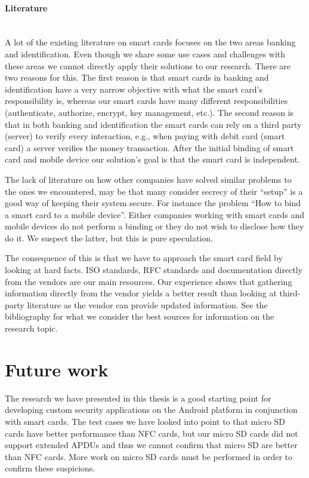 \paragraph{Literature}\mbox{}\\
A lot of the existing literature on smart cards focuses on the two areas banking and identification. Even though we share some use cases and challenges with these areas we cannot directly apply their solutions to our research. There are two reasons for this. The first reason is that smart cards in banking and identification have a very narrow objective with what the smart card's responsibility is, whereas our smart cards have many different responsibilities (authenticate, authorize, encrypt, key management, etc.). The second reason is that in both banking and identification the smart cards can rely on a third party (server) to verify every interaction, e.g., when paying with debit card (smart card) a server verifies the money transaction. After the initial binding of smart card and mobile device our solution's goal is that the smart card is independent.

The lack of literature on how other companies have solved similar problems to the ones we encountered, may be that many consider secrecy of their ``setup'' is a good way of keeping their system secure. For instance the problem ``How to bind a smart card to a mobile device''. Either companies working with smart cards and mobile devices do not perform a binding or they do not wish to disclose how they do it. We suspect the latter, but this is pure speculation.

The consequence of this is that we have to approach the smart card field by looking at hard facts. ISO standards, RFC standards and documentation directly from the vendors are our main resources. Our experience shows that gathering information directly from the vendor yields a better result than looking at third-party literature as the vendor can provide updated information. See the bibliography for what we consider the best sources for information on the research topic.

\section{Future work}
\label{sec:future}
The research we have presented in this thesis is a good starting point for developing custom security applications on the Android platform in conjunction with smart cards. The test cases we have looked into point to that micro SD cards have better performance than NFC cards, but our micro SD cards did not support extended APDUs and thus we cannot confirm that micro SD are better than NFC cards. More work on micro SD cards must be performed in order to confirm these suspicions.

